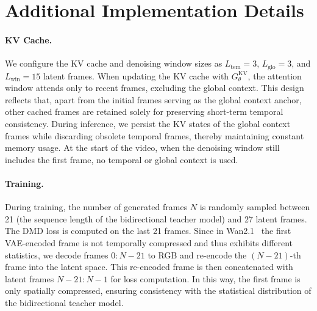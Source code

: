 \appendix



\section{Additional Implementation Details}



\paragraph{KV Cache.}
We configure the KV cache and denoising window sizes as $L_\text{tem}=3$, $L_\text{glo}=3$, and $L_\text{win}=15$ latent frames. When updating the KV cache with $G_\theta^\text{KV}$, the attention window attends only to recent frames, excluding the global context. This design reflects that, apart from the initial frames serving as the global context anchor, other cached frames are retained solely for preserving short-term temporal consistency. During inference, we persist the KV states of the global context frames while discarding obsolete temporal frames, thereby maintaining constant memory usage. At the start of the video, when the denoising window still includes the first frame, no temporal or global context is used. 

\paragraph{Training.}
During training, the number of generated frames $N$ is randomly sampled between 21 (the sequence length of the bidirectional teacher model) and 27 latent frames. The DMD loss is computed on the last 21 frames. Since in Wan2.1~\citep{wan2025wan} the first VAE-encoded frame is not temporally compressed and thus exhibits different statistics, we decode frames $0{:}N{-}21$ to RGB and re-encode the $(N{-}21)$-th frame into the latent space. This re-encoded frame is then concatenated with latent frames $N{-}21{:}N{-}1$ for loss computation. In this way, the first frame is only spatially compressed, ensuring consistency with the statistical distribution of the bidirectional teacher model.


